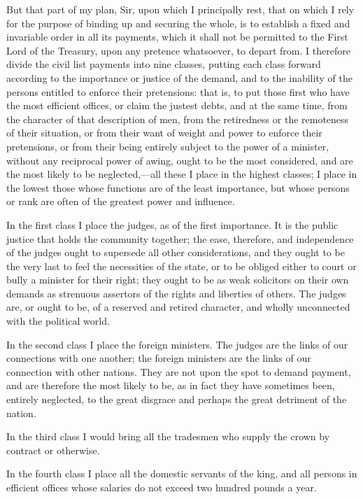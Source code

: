 But that part of my plan, Sir, upon which I principally rest, that on which I rely for the purpose of binding up and securing the whole, is to establish a fixed and invariable order in all its payments, which it shall not be permitted to the First Lord of the Treasury, upon any pretence whatsoever, to depart from. I therefore divide the civil list payments into nine classes, putting each class forward according to the importance or justice of the demand, and to the inability of the persons entitled to enforce their pretensions: that is, to put those first who have the most efficient offices, or claim the justest debts, and at the same time, from the character of that description of men, from the retiredness or the remoteness of their situation, or from their want of weight and power to enforce their pretensions, or from their being entirely subject to the power of a minister, without any reciprocal power of awing, ought to be the most considered, and are the most likely to be neglected,—all these I place in the highest classes; I place in the lowest those whose functions are of the least importance, but whose persons or rank are often of the greatest power and influence.

In the first class I place the judges, as of the first importance. It is the public justice that holds the community together; the ease, therefore, and independence of the judges ought to supersede all other considerations, and they ought to be the very last to feel the necessities of the state, or to be obliged either to court or bully a minister for their right; they ought to be as weak solicitors on their own demands as strenuous assertors of the rights and liberties of others. The judges are, or ought to be, of a reserved and retired character, and wholly unconnected with the political world.

In the second class I place the foreign ministers. The judges are the links of our connections with one another; the foreign ministers are the links of our connection with other nations. They are not upon the spot to demand payment, and are therefore the most likely to be, as in fact they have sometimes been, entirely neglected, to the great disgrace and perhaps the great detriment of the nation.

In the third class I would bring all the tradesmen who supply the crown by contract or otherwise.

In the fourth class I place all the domestic servants of the king, and all persons in efficient offices whose salaries do not exceed two hundred pounds a year.

